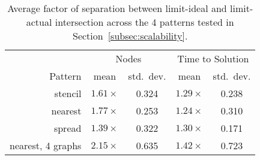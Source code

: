 \begin{table}[t]
\color{blue}
\centering
\small
\begin{tabular}{r | c | c | c | c}
        & \multicolumn{2}{|c|}{Nodes} & \multicolumn{2}{|c}{Time to Solution} \\
Pattern & mean & std.~dev. & mean & std.~dev. \\
\hline
stencil & $1.61\times$ & 0.324 & $1.29\times$ & 0.238 \\
nearest & $1.77\times$ & 0.253 & $1.24\times$ & 0.310 \\
spread  & $1.39\times$ & 0.322 & $1.30\times$ & 0.171 \\
nearest, 4 graphs & $2.15\times$ & 0.635 & $1.42\times$ & 0.723
\end{tabular}

\vspace{-0.20cm}
\caption{\color{blue} Average factor of separation between limit-ideal and limit-actual intersection across the 4 patterns tested in Section~\ref{subsec:scalability}.\label{tab:metg-predict-strong}}
\vspace{-0.5cm}
\end{table}
